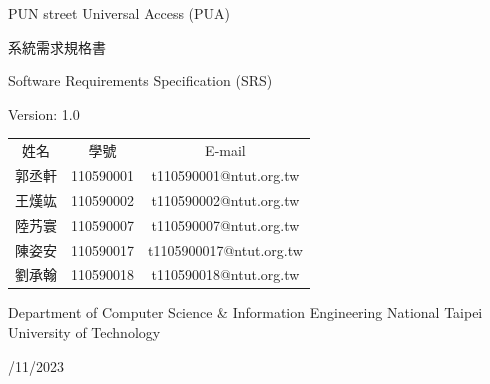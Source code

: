 \documentclass[a4paper, 12pt]{article}
\def\myProjectName{PUN street Universal Access (PUA)}
\def\myVersion{1.0}
\newcommand\TwentyTitle{\fontsize{20pt}{24pt}\selectfont}
\newcommand\EighteenTitle{\fontsize{18pt}{20pt}\selectfont}
\newcommand\SixteenTitle{\fontsize{16pt}{18pt}\selectfont}
\begin{document}
\thispagestyle{empty}
\begin{center}
    {\TwentyTitle \myProjectName \par}
    \vspace{6cm}
    {\TwentyTitle 系統需求規格書 \par}
    {\EighteenTitle Software Requirements Specification (SRS) \par}
    {\SixteenTitle Version: \myVersion \par}
    \vspace{4cm}
    {\SixteenTitle
    \begin{tabular}{ccc}
      姓名 & 學號 & E-mail \\[0.2em]
      郭丞軒 & 110590001 & t110590001@ntut.org.tw \\
      王熯竑 & 110590002 & t110590002@ntut.org.tw \\
      陸艿寰 & 110590007 & t110590007@ntut.org.tw \\
      陳姿安 & 110590017 & t1105900017@ntut.org.tw \\
      劉承翰 & 110590018 & t110590018@ntut.org.tw \\
    \end{tabular}
    \par}
    \vspace{2cm}
    {\SixteenTitle Department of Computer Science \& Information Engineering National Taipei University of Technology \par}
    \vspace{16pt}
    {\SixteenTitle 10/11/2023 \par}
\end{center}
\clearpage

\renewcommand{\contentsname}{目錄 (Table of Contents)}
\tableofcontents
\newpage



\end{document}
